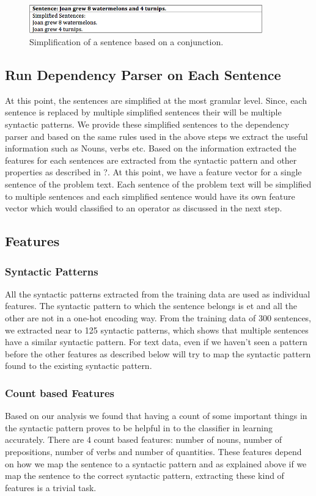 \documentclass[11pt]{article}
\begin{document}
\begin{figure}[h!]
\includegraphics[width=0.90\textwidth]{Figure4}
\centering
\caption{\label{fig:Figure4}Simplification of a sentence based on a conjunction.}
\end{figure}

\subsection{Run Dependency Parser on Each Sentence}
At this point, the sentences are simplified at the most granular level. Since, each sentence is replaced by multiple simplified sentences their will be multiple syntactic patterns. We provide these simplified sentences to the dependency parser and based on the same rules used in the above steps we extract the useful information such as Nouns, verbs etc. Based on the information extracted the features for each sentences are extracted from the syntactic pattern and other properties as described in ?. At this point, we have a feature vector for a single sentence of the problem text. Each sentence of the problem text will be simplified to multiple sentences and each simplified sentence would have its own feature vector which would classified to an operator as discussed in the next step.

\subsection{Features} 
\subsubsection{Syntactic Patterns}
All the syntactic patterns extracted from the training data are used as individual features. The syntactic pattern to which the sentence belongs is et and all the other are not in a one-hot encoding way. From the training data of 300 sentences, we extracted near to 125 syntactic patterns, which shows that multiple sentences have a similar syntactic pattern. For text data, even if we haven't seen a pattern before the other features as described below will try to map the syntactic pattern found to the existing syntactic pattern. 

\subsubsection{Count based Features}
Based on our analysis we found that having a count of some important things in the syntactic pattern proves to be helpful in to the classifier in learning accurately. There are 4 count based features: number of nouns, number of prepositions, number of verbs and number of quantities. These features depend on how we map the sentence to a syntactic pattern and as explained above if we map the sentence to the correct syntactic pattern, extracting these kind of features is a trivial task.
\end{document}
